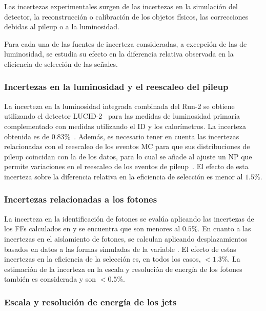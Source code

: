 Las incertezas experimentales surgen de las incertezas en la simulación del detector, la reconstrucción o calibración de los objetos físicos, las correcciones debidas al pileup o a la luminosidad.

Para cada una de las fuentes de incerteza consideradas, a excepción de las de luminosidad, se estudia su efecto en la diferencia relativa observada en la eficiencia de selección de las señales.



\subsubsection{Incertezas en la luminosidad y el reescaleo del pileup}
La incerteza en la luminosidad integrada combinada del Run-2 se obtiene utilizando el detector LUCID-2~\cite{ATLAS-LUCID2} para las medidas de luminosidad primaria complementado con medidas utilizando el \ac{ID} y los calorímetros. La incerteza obtenida es de \(0.83\%\)~\cite{ATLAS-Lumi-Run2}.
Además, es necesario tener en cuenta las incertezas relacionadas con el reescaleo de los eventos \ac{MC} para que sus distribuciones de pileup coincidan con la de los datos, para lo cual se añade al ajuste un \ac{NP} que permite variaciones en el reescaleo de los eventos de pileup~\cite{ATLAS-PileupRW}. El efecto de esta incerteza sobre la diferencia relativa en la eficiencia de selección es menor al \(1.5\%\).


\subsubsection{Incertezas relacionadas a los fotones}
La incerteza en la identificación de fotones se evalúa aplicando las incertezas de los \acp{FF} calculados en \Ch{\ref{ch:ss_corrections}} y se encuentra que son menores al \(0.5\%\).
En cuanto a las incertezas en el aislamiento de fotones, se calculan aplicando desplazamientos basados en datos a las formas simuladas de la variable \etiso. El efecto de estas incertezas en la eficiencia de la selección es, en todos los casos, \(<1.3\%\).
La estimación de la incerteza en la escala y resolución de energía de los fotones también es considerada y son \(<0.5\%\).


\subsubsection{Escala y resolución de energía de los jets}

